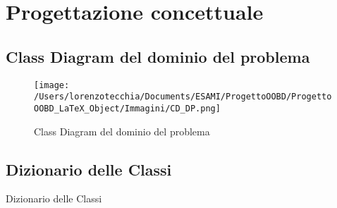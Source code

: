 \chapter{Progettazione concettuale}
    \section{Class Diagram del dominio del problema}
    	\begin{figure}[hbt]
  			\texttt{[image: /Users/lorenzotecchia/Documents/ESAMI/ProgettoOOBD/ProgettoOOBD\_LaTeX\_Object/Immagini/CD\_DP.png]}
  			\caption{Class Diagram del dominio del problema}
	\end{figure}
    \newpage
    \begin{table}[]
\section{Dizionario delle Classi}
\caption{Dizionario delle Classi}

\label{tab:DizionarioClassi}


\end{table}

